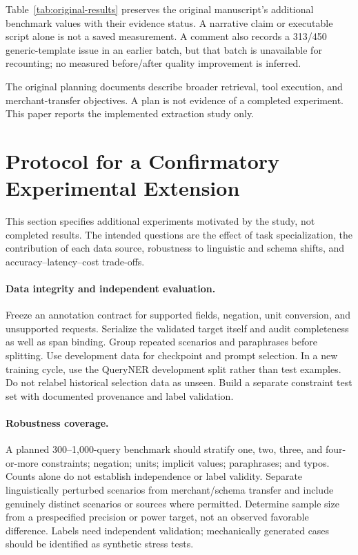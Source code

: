 Table~\ref{tab:original-results} preserves the original manuscript's additional benchmark values with their evidence status. A narrative claim or executable script alone is not a saved measurement. A comment also records a 313/450 generic-template issue in an earlier batch, but that batch is unavailable for recounting; no measured before/after quality improvement is inferred.

The original planning documents describe broader retrieval, tool execution, and merchant-transfer objectives. A plan is not evidence of a completed experiment. This paper reports the implemented extraction study only.

\section{Protocol for a Confirmatory Experimental Extension}
\label{app:future}
This section specifies additional experiments motivated by the study, not completed results. The intended questions are the effect of task specialization, the contribution of each data source, robustness to linguistic and schema shifts, and accuracy--latency--cost trade-offs.

\paragraph{Data integrity and independent evaluation.}
Freeze an annotation contract for supported fields, negation, unit conversion, and unsupported requests. Serialize the validated target itself and audit completeness as well as span binding. Group repeated scenarios and paraphrases before splitting. Use development data for checkpoint and prompt selection. In a new training cycle, use the QueryNER development split rather than test examples. Do not relabel historical selection data as unseen. Build a separate constraint test set with documented provenance and label validation.

\paragraph{Robustness coverage.}
A planned 300--1,000-query benchmark should stratify one, two, three, and four-or-more constraints; negation; units; implicit values; paraphrases; and typos. Counts alone do not establish independence or label validity. Separate linguistically perturbed scenarios from merchant/schema transfer and include genuinely distinct scenarios or sources where permitted. Determine sample size from a prespecified precision or power target, not an observed favorable difference. Labels need independent validation; mechanically generated cases should be identified as synthetic stress tests.

